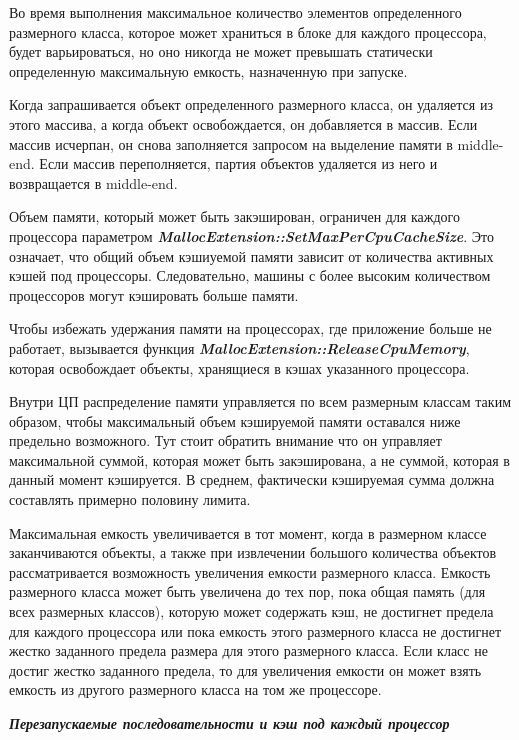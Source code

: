Во время выполнения максимальное количество элементов определенного размерного класса, которое может храниться в блоке для каждого процессора, будет варьироваться, но оно никогда не может превышать статически определенную максимальную емкость, назначенную при запуске.

Когда запрашивается объект определенного размерного класса, он удаляется из этого массива, а когда объект освобождается, он добавляется в массив. Если массив исчерпан, он снова заполняется запросом на выделение памяти в middle-end. Если массив переполняется, партия объектов удаляется из него и возвращается в middle-end.

Объем памяти, который может быть закэширован, ограничен для каждого процессора параметром \textbf{\textit{MallocExtension::SetMaxPerCpuCacheSize}}. Это означает, что общий объем кэшиуемой памяти зависит от количества активных кэшей под процессоры. Следовательно, машины с более высоким количеством процессоров могут кэшировать больше памяти.

Чтобы избежать удержания памяти на процессорах, где приложение больше не работает, вызывается функция \textbf{\textit{MallocExtension::ReleaseCpuMemory}}, которая освобождает объекты, хранящиеся в кэшах указанного процессора.

Внутри ЦП распределение памяти управляется по всем размерным классам таким образом, чтобы максимальный объем кэшируемой памяти оставался ниже предельно возможного. Тут стоит обратить внимание что он управляет максимальной суммой, которая может быть закэширована, а не суммой, которая в данный момент кэшируется. В среднем, фактически кэшируемая сумма должна составлять примерно половину лимита.

Максимальная емкость увеличивается в тот момент, когда в размерном классе заканчиваются объекты, а также при извлечении большого количества объектов рассматривается возможность увеличения емкости размерного класса. Емкость размерного класса может быть увеличена до тех пор, пока общая память (для всех размерных классов), которую может содержать кэш, не достигнет предела для каждого процессора или пока емкость этого размерного класса не достигнет жестко заданного предела размера для этого размерного класса. Если класс не достиг жестко заданного предела, то для увеличения емкости он может взять емкость из другого размерного класса на том же процессоре.

\bigbreak
\textit{\textbf{Перезапускаемые последовательности и кэш под каждый процессор}}

